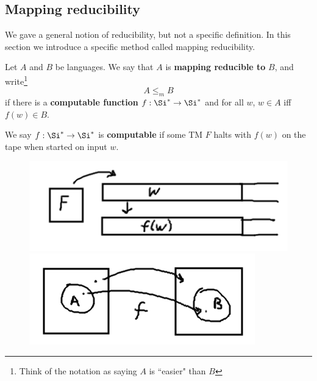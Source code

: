 \subsection{Mapping reducibility}
We gave a general notion of reducibility, but not a specific definition. In this section we introduce a specific method called mapping reducibility.
\begin{df}
Let $A$ and $B$ be languages. We say that $A$ is \textbf{mapping reducible to} $B$, and write\footnote{Think of the notation as saying $A$ is ``easier" than $B$}
\[
A\le_m B
\]
if there is a \textbf{computable function} $f:\Si^*\to \Si^*$ and for all $w$, $w\in A$ iff $f(w)\in B$.

We say $f:\Si^*\to \Si^*$ is \textbf{computable} if some TM $F$ halts with $f(w)$ on the tape when started on input $w$.
\end{df}

\begin{center}
\begin{figure}[h!]
\includegraphics[scale=1.0]{9-1}
\qquad
\includegraphics[scale=1.0]{9-2}
\end{figure}
\end{center}


